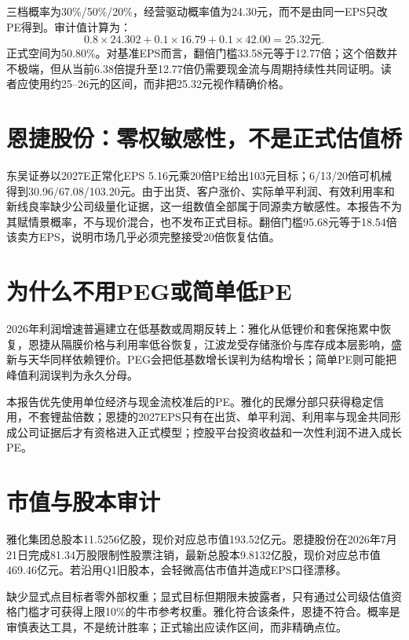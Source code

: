 三档概率为30\%/50\%/20\%，经营驱动概率值为24.30元，而不是由同一EPS只改PE得到。审计值计算为：
\[
0.8\times24.302+0.1\times16.79+0.1\times42.00=25.32\text{元}.
\]
正式空间为50.80\%。对基准EPS而言，翻倍门槛33.58元等于12.77倍；这个倍数并不极端，但从当前6.38倍提升至12.77倍仍需要现金流与周期持续性共同证明。读者应使用约25--26元的区间，而非把25.32元视作精确价格。

\section{恩捷股份：零权敏感性，不是正式估值桥}

东吴证券以2027E正常化EPS 5.16元乘20倍PE给出103元目标；6/13/20倍可机械得到30.96/67.08/103.20元。由于出货、客户涨价、实际单平利润、有效利用率和新线良率缺少公司级量化证据，这一组数值全部属于同源卖方敏感性。本报告不为其赋情景概率，不与现价混合，也不发布正式目标。翻倍门槛95.68元等于18.54倍该卖方EPS，说明市场几乎必须完整接受20倍恢复估值。

\section{为什么不用PEG或简单低PE}

2026年利润增速普遍建立在低基数或周期反转上：雅化从低锂价和套保拖累中恢复，恩捷从隔膜价格与利用率低谷恢复，江波龙受存储涨价与库存成本层影响，盛新与天华同样依赖锂价。PEG会把低基数增长误判为结构增长；简单PE则可能把峰值利润误判为永久分母。

本报告优先使用单位经济与现金流校准后的PE。雅化的民爆分部只获得稳定信用，不套锂盐倍数；恩捷的2027EPS只有在出货、单平利润、利用率与现金共同形成公司证据后才有资格进入正式模型；控股平台投资收益和一次性利润不进入成长PE。

\section{市值与股本审计}

雅化集团总股本11.5256亿股，现价对应总市值193.52亿元。恩捷股份在2026年7月21日完成81.34万股限制性股票注销，最新总股本9.8132亿股，现价对应总市值469.46亿元。若沿用Q1旧股本，会轻微高估市值并造成EPS口径漂移。

\begin{sourcequalitybox}[估值治理]
缺少显式点目标者零外部权重；显式目标但期限未披露者，只有通过公司级估值资格门槛才可获得上限10\%的牛市参考权重。雅化符合该条件，恩捷不符合。概率是审慎表达工具，不是统计胜率；正式输出应读作区间，而非精确点位。
\end{sourcequalitybox}

\clearpage
